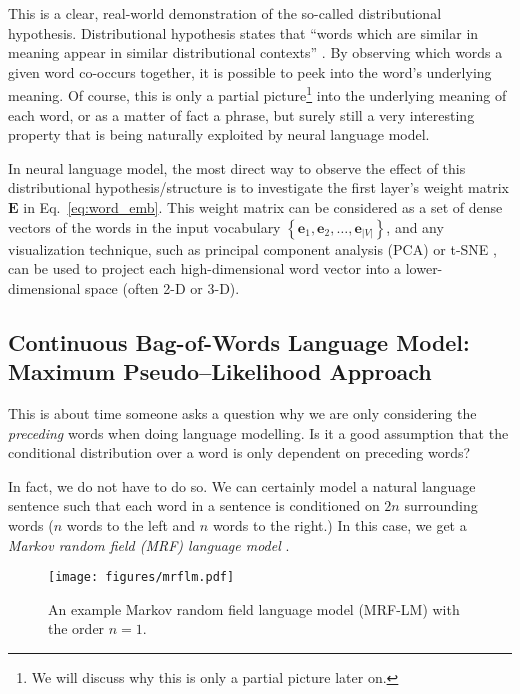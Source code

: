 \documentclass{report}
\newcommand{\vect}[1]{\mathbf{#1}}
\newcommand{\matr}[1]{\mathbf{#1}}
\newcommand{\ve}[0]{\vect{e}}
\newcommand{\mE}[0]{\matr{E}}
\begin{document}
This is a clear, real-world demonstration of the so-called distributional
hypothesis. Distributional hypothesis states that ``words which are similar in
meaning appear in similar distributional contexts'' \citep{firth1957}. By
observing which words a given word co-occurs together, it is possible to peek
into the word's underlying meaning. Of course, this is only a partial
picture\footnote{
    We will discuss why this is only a partial picture later on.
}
into the underlying meaning of each word, or as a matter of fact a phrase, but
surely still a very interesting property that is being naturally exploited by
neural language model.

In neural language model, the most direct way to observe the effect of this
distributional hypothesis/structure is to investigate the first layer's weight
matrix $\mE$ in Eq.~\eqref{eq:word_emb}. This weight matrix can be considered as
a set of dense vectors of the words in the input vocabulary $\left\{ \ve_1,
\ve_2, \ldots, \ve_{|V|}\right\}$, and any visualization technique, such as
principal component analysis (PCA) or t-SNE \citep{VanDerMaaten08}, can be used
to project each high-dimensional word vector into a lower-dimensional space
(often 2-D or 3-D). 


\subsection{Continuous Bag-of-Words Language Model: \\ Maximum Pseudo--Likelihood
Approach}
\label{sec:cbow}

This is about time someone asks a question why we are only considering the {\em
preceding} words when doing language modelling. Is it a good assumption that the
conditional distribution over a word is only dependent on preceding words? 

In fact, we do not have to do so. We can certainly model a natural language
sentence such that each word in a sentence is conditioned on $2n$ surrounding
words ($n$ words to the left and $n$ words to the right.) In this case, we get a
{\em Markov random field (MRF) language model} \citep{jernite2015fast}.

\begin{figure}[ht]
    \centering
    \texttt{[image: figures/mrflm.pdf]}
    \caption{An example Markov random field language model (MRF-LM) with the
    order $n=1$.}
    \label{fig:mrf_lm}
\end{figure}
\end{document}
